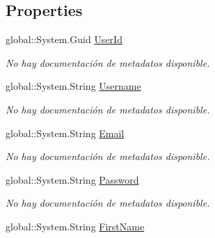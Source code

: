 \subsection*{Properties}
\begin{DoxyCompactItemize}
\item 
global\-::\-System.\-Guid \hyperlink{class_microsoft_1_1_samples_1_1_kinect_1_1_basic_interactions_1_1_users_a99471154b57f706a5484f4f20a504acc}{User\-Id}
\begin{DoxyCompactList}\small\item\em No hay documentación de metadatos disponible. \end{DoxyCompactList}\item 
global\-::\-System.\-String \hyperlink{class_microsoft_1_1_samples_1_1_kinect_1_1_basic_interactions_1_1_users_aa69014a550876a3c85fb3d81ac7ae968}{Username}
\begin{DoxyCompactList}\small\item\em No hay documentación de metadatos disponible. \end{DoxyCompactList}\item 
global\-::\-System.\-String \hyperlink{class_microsoft_1_1_samples_1_1_kinect_1_1_basic_interactions_1_1_users_acbbd20da30d6f21cf9145d8859770953}{Email}
\begin{DoxyCompactList}\small\item\em No hay documentación de metadatos disponible. \end{DoxyCompactList}\item 
global\-::\-System.\-String \hyperlink{class_microsoft_1_1_samples_1_1_kinect_1_1_basic_interactions_1_1_users_ac663b6e9db20bbb4af991a8f61055a86}{Password}
\begin{DoxyCompactList}\small\item\em No hay documentación de metadatos disponible. \end{DoxyCompactList}\item 
global\-::\-System.\-String \hyperlink{class_microsoft_1_1_samples_1_1_kinect_1_1_basic_interactions_1_1_users_ab5a745927dc2a54ae41863eb2fa38c5f}{First\-Name}

\end{DoxyCompactItemize}
